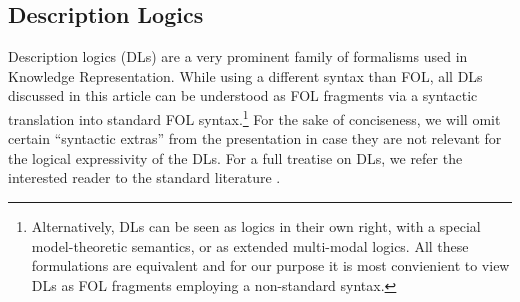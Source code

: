 \documentclass[10pt,a4paper]{amsart}
\theoremstyle{definition}
\numberwithin{equation}{section}
\theoremstyle{plain}
\theoremstyle{definition}
\theoremstyle{myexample}
\theoremstyle{plain}
\theoremstyle{definition}
\newcommand{\fcn}[1]{\mathsf{#1}}
\begin{document}
\subsection{Description Logics}\label{app:DLintro}
\newcommand{\Preds}{\Sigma}
\newcommand{\Consts}{\mathbf{C}}
\newcommand{\ebnfeq}{::=}
\newcommand{\conc}[1]{#1}
\newcommand{\rol}[1]{#1}
\newcommand{\ind}[1]{\mathtt{#1}}
\newcommand{\inda}{\ind{a}}
\newcommand{\indb}{\ind{b}}
\newcommand{\indc}{\ind{c}}
\newcommand{\indd}{\ind{d}}
\newcommand{\rolexpR}{\rol{R}}
\newcommand{\rolexpS}{\rol{S}}
\newcommand{\rolR}{\rol{R}}
\newcommand{\rolnR}{\mathtt{R}}
\newcommand{\rolS}{\rol{S}}
\newcommand{\rolnS}{\mathtt{S}}
\newcommand{\rolT}{\mathtt{t}}
\newcommand{\rolU}{\mathtt{U}}
\newcommand{\rolV}{\rol{V}}
\newcommand{\rolW}{\rol{W}}
\newcommand{\conA}{\mathtt{A}}
\newcommand{\connA}{\mathtt{A}}
\newcommand{\conB}{\mathtt{B}}
\newcommand{\conC}{\conc{C}}
\newcommand{\conD}{\conc{D}}
\newcommand{\conE}{\conc{E}}
\newcommand{\conF}{\conc{F}}
\newcommand{\conS}{\mathtt{M}}
\newcommand{\atleast}[1]{\mathord{\geqslant}#1\,}
\newcommand{\atmost}[1]{\mathord{\leqslant}#1\,}
\newcommand{\Self}{\text{\sf{Self}}}
\newcommand{\ssb}{\sqsubseteq}
\newcommand{\SROIQ}{\mbox{$\mathcal{SROIQ}b_s$}}
\newcommand{\define}[1]{\emph{#1}}
\newcommand{\connames}{\Preds_1}
\newcommand{\rolnames}{\Preds_2}
\newcommand{\indnames}{\mathbf{C}}
\newcommand{\Inv}{\fcn{inv}}
\newcommand{\Dis}{\mathrm{Dis}}
\newcommand{\itemb}{\item}
\newcommand{\Vars}{\mathbf{V}}
\newcommand{\llang}[1]{\mathscr{#1}}

Description logics (DLs) are a very prominent family of formalisms used in Knowledge Representation. While using a different syntax than FOL, all DLs discussed in this article can be understood as FOL fragments via a syntactic translation into standard FOL syntax.\footnote{Alternatively, DLs can be seen as logics in their own right, with a special model-theoretic semantics, or as extended multi-modal logics. All these formulations are equivalent and for our purpose it is most convienient to view DLs as FOL fragments employing a non-standard syntax.} For the sake of conciseness, we will omit certain ``syntactic extras'' from the presentation in case they are not relevant for the logical expressivity of the DLs. For a full treatise on DLs, we refer the interested reader to the standard literature \cite{baader_horrocks_lutz_sattler_2017,Rudolph11}.
\end{document}
